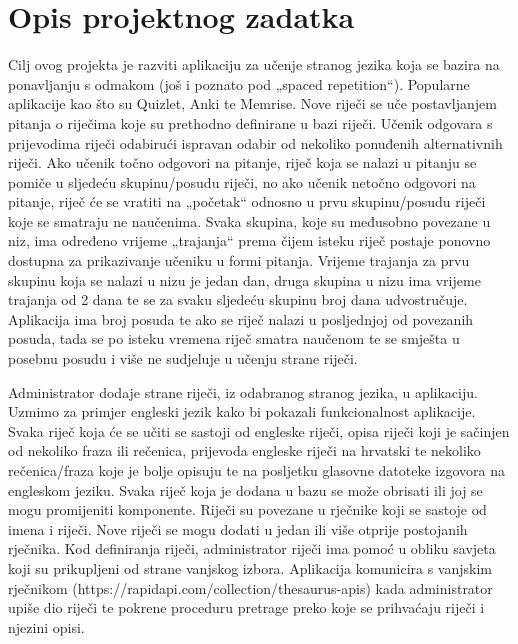 \chapter{Opis projektnog zadatka}
		
Cilj ovog projekta je razviti aplikaciju za učenje stranog jezika koja se bazira na ponavljanju s odmakom (još i poznato pod „spaced repetition“). Popularne aplikacije kao što su Quizlet, Anki te Memrise. Nove riječi se uče postavljanjem pitanja o riječima koje su prethodno definirane u bazi riječi. Učenik odgovara s prijevodima riječi odabirući ispravan odabir od nekoliko ponuđenih alternativnih riječi. Ako učenik točno odgovori na pitanje, riječ koja se nalazi u pitanju se pomiče u sljedeću skupinu/posudu riječi, no ako učenik netočno odgovori na pitanje, riječ će se vratiti na „početak“ odnosno u prvu skupinu/posudu riječi koje se smatraju ne naučenima. Svaka skupina, koje su međusobno povezane u niz, ima određeno vrijeme „trajanja“ prema čijem isteku riječ postaje ponovno dostupna za prikazivanje učeniku u formi pitanja. Vrijeme trajanja za prvu skupinu koja se nalazi u nizu je jedan dan, druga skupina u nizu ima vrijeme trajanja od 2 dana te se za svaku sljedeću skupinu broj dana udvostručuje. Aplikacija ima        broj posuda te ako se riječ nalazi u posljednjoj od povezanih posuda, tada se po isteku vremena riječ smatra naučenom te se smješta u posebnu posudu i više ne sudjeluje u učenju strane riječi. 

Administrator dodaje strane riječi, iz odabranog stranog jezika, u aplikaciju. Uzmimo za primjer engleski jezik kako bi pokazali funkcionalnost aplikacije. Svaka riječ koja će se učiti se sastoji od engleske riječi, opisa riječi koji je sačinjen od nekoliko fraza ili rečenica, prijevoda engleske riječi na hrvatski te nekoliko rečenica/fraza koje je bolje opisuju te na posljetku glasovne datoteke izgovora na engleskom jeziku. Svaka riječ koja je dodana u bazu se može obrisati ili joj se mogu promijeniti komponente. Riječi su povezane u rječnike koji se sastoje od imena i riječi. Nove riječi se mogu dodati u jedan ili više otprije postojanih rječnika. Kod definiranja riječi, administrator riječi ima pomoć u obliku savjeta koji su prikupljeni od strane vanjskog izbora. Aplikacija komunicira s vanjskim rječnikom (https://rapidapi.com/collection/thesaurus-apis) kada administrator upiše dio riječi te pokrene proceduru pretrage preko koje se prihvaćaju riječi i njezini opisi. 

